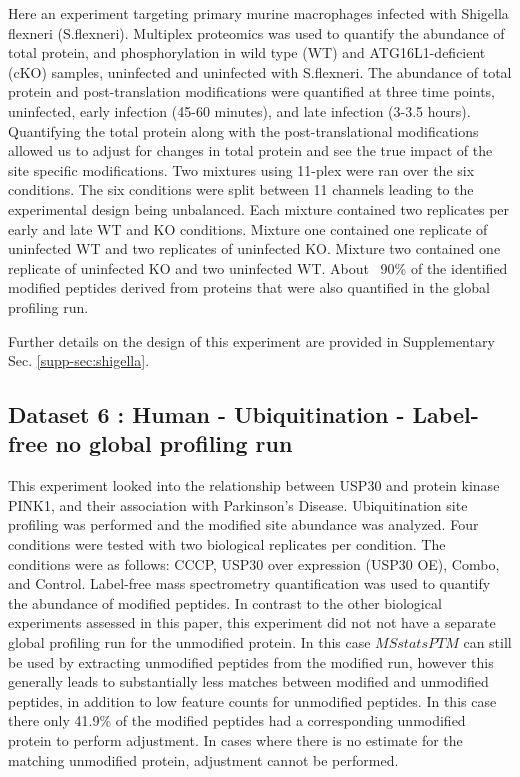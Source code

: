 \documentclass[mcp]{article}
\numberwithin{figure}{section} %
\numberwithin{table}{section}
\begin{document}
Here an experiment targeting primary murine macrophages infected with Shigella flexneri (S.flexneri)\cite{Maculins}. Multiplex proteomics was used to quantify the abundance of total protein, and phosphorylation in wild type (WT) and ATG16L1-deficient (cKO) samples, uninfected and uninfected with S.flexneri. The abundance of total protein and post-translation modifications were quantified at three time points, uninfected, early infection (45-60 minutes), and late infection (3-3.5 hours). Quantifying the total protein along with the post-translational modifications allowed us to adjust for changes in total protein and see the true impact of the site specific modifications. Two mixtures using 11-plex were ran over the six conditions. The six conditions were split between 11 channels leading to the experimental design being unbalanced. Each mixture contained two replicates per early and late WT and KO conditions. Mixture one contained one replicate of uninfected WT and two replicates of uninfected KO. Mixture two contained one replicate of uninfected KO and two uninfected WT. About ~90\% of the identified modified peptides derived from proteins that were also quantified in the global profiling run.

Further details on the design of this experiment are provided in Supplementary Sec. \ref{supp-sec:shigella}.

\subsection*{Dataset 6 : Human - Ubiquitination - Label-free no global profiling run}

This experiment looked into the relationship between USP30 and protein kinase PINK1, and their association with Parkinson’s Disease. Ubiquitination site profiling was performed and the modified site abundance was analyzed. Four conditions were tested with two biological replicates per condition. The conditions were as follows: CCCP, USP30 over expression (USP30 OE), Combo, and Control. Label-free mass spectrometry quantification was used to quantify the abundance of modified peptides. In contrast to the other biological experiments assessed in this paper, this experiment did not not have a separate global profiling run for the unmodified protein. In this case $MSstatsPTM$ can still be used by extracting unmodified peptides from the modified run, however this generally leads to substantially less matches between modified and unmodified peptides, in addition to low feature counts for unmodified peptides. In this case there only 41.9\% of the modified peptides had a corresponding unmodified protein to perform adjustment. In cases where there is no estimate for the matching unmodified protein, adjustment cannot be performed.
\end{document}
